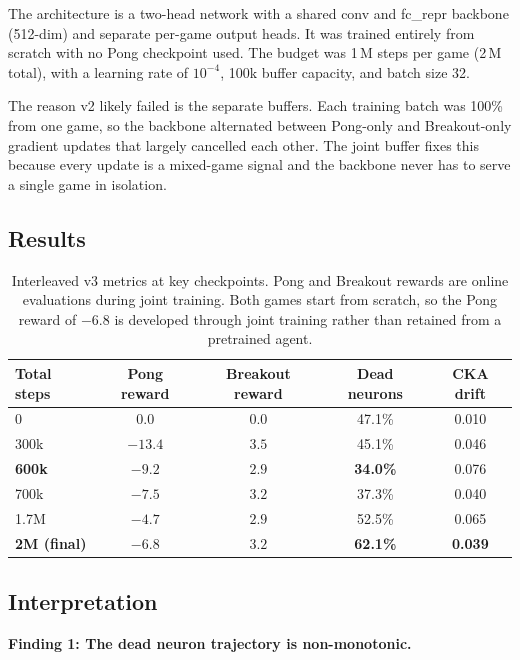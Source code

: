 \documentclass[11pt,a4paper]{article}
\begin{document}
The architecture is a two-head network with a shared conv and fc\_repr backbone (512-dim)
and separate per-game output heads. It was trained entirely from scratch with no Pong
checkpoint used. The budget was 1\,M steps per game (2\,M total), with a learning rate
of $10^{-4}$, 100k buffer capacity, and batch size 32.

The reason v2 likely failed is the separate buffers. Each training batch was 100\% from
one game, so the backbone alternated between Pong-only and Breakout-only gradient updates
that largely cancelled each other. The joint buffer fixes this because every update is a
mixed-game signal and the backbone never has to serve a single game in isolation.

\subsection*{Results}

\begin{table}[h]
\centering\small
\begin{tabular}{lcccc}
\toprule
\textbf{Total steps} & \textbf{Pong reward} & \textbf{Breakout reward} & \textbf{Dead neurons} & \textbf{CKA drift} \\
\midrule
0             & $0.0$   & $0.0$ & 47.1\% & 0.010 \\
300k          & $-13.4$ & $3.5$ & 45.1\% & 0.046 \\
\textbf{600k} & $-9.2$  & $2.9$ & \textbf{34.0\%} & 0.076 \\
700k          & $-7.5$  & $3.2$ & 37.3\% & 0.040 \\
1.7M          & $-4.7$  & $2.9$ & 52.5\% & 0.065 \\
\textbf{2M (final)} & $\mathbf{-6.8}$ & $\mathbf{3.2}$ & \textbf{62.1\%} & \textbf{0.039} \\
\bottomrule
\end{tabular}
\caption{Interleaved v3 metrics at key checkpoints. Pong and Breakout rewards are online
evaluations during joint training. Both games start from scratch, so the Pong reward of
$-6.8$ is developed through joint training rather than retained from a pretrained agent.}
\end{table}

\subsection*{Interpretation}

\textbf{Finding 1: The dead neuron trajectory is non-monotonic.}
\end{document}
